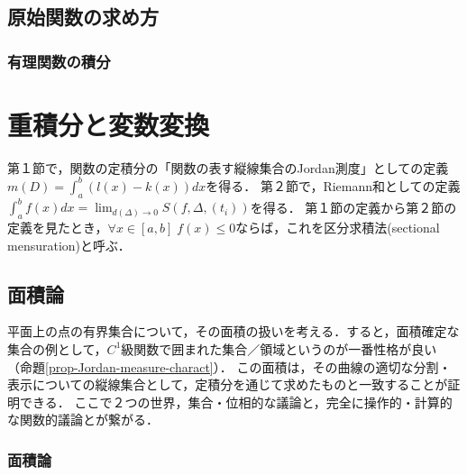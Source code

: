 \documentclass[uplatex, dvipdfmx]{jsreport}
\begin{document}
\section{原始関数の求め方}

\subsection{有理関数の積分}


\begin{shadebox}
    \begin{theorem}[部分分数展開]
        
    \end{theorem}
\end{shadebox}

\chapter{重積分と変数変換}

第１節で，関数の定積分の「関数の表す縦線集合のJordan測度」としての定義$m(D)=\int^b_a(l(x)-k(x))dx$を得る．
第２節で，Riemann和としての定義$\int^b_a f(x)dx = \lim_{d(\Delta)\to 0} S(f,\Delta,(t_i))$を得る．
第１節の定義から第２節の定義を見たとき，$\forall x\in [a,b]\; f(x)\le 0$ならば，これを区分求積法(sectional mensuration)と呼ぶ．

\section{面積論}
平面上の点の有界集合について，その面積の扱いを考える．すると，面積確定な集合の例として，$C^1$級関数で囲まれた集合／領域というのが一番性格が良い（命題\ref{prop-Jordan-measure-charact}）．
この面積は，その曲線の適切な分割・表示についての縦線集合として，定積分を通じて求めたものと一致することが証明できる．
ここで２つの世界，集合・位相的な議論と，完全に操作的・計算的な関数的議論とが繋がる．

\subsection{面積論}
\end{document}
